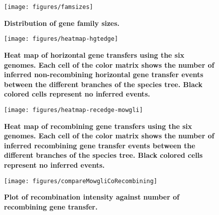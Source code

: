 \documentclass[10pt]{article}
\begin{document}
\begin{figure}[!ht]
\begin{center}
\texttt{[image: figures/famsizes]}
\end{center}
\caption{\bf{Distribution of gene family sizes.}}
\label{fig:famsizes}
\end{figure}
\clearpage{}

\begin{figure}[!ht]
\begin{center}
\texttt{[image: figures/heatmap-hgtedge]}
\end{center}
\caption{
\bf{Heat map of horizontal gene transfers using the six genomes.}
Each cell of the color matrix shows the number of inferred non-recombining
horizontal gene transfer events between the different branches of the species
tree. Black colored cells represent no inferred events.}
\label{fig:hgt-heatmap}
\end{figure}
\clearpage{}%

\begin{figure}[!ht]
\begin{center}
\texttt{[image: figures/heatmap-recedge-mowgli]}
\end{center}
\caption{
\bf{Heat map of recombining gene transfers using the six genomes.}
Each cell of the color matrix shows the number of inferred recombining
gene transfer events between the different branches of the species
tree. Black colored cells represent no inferred events.}
\label{fig:mowgli-recomb-heatmap}
\end{figure}
\clearpage{}

\begin{figure}[!ht]
\begin{center}
\texttt{[image: figures/compareMowgliCoRecombining]}
\end{center}
\caption{
\bf{Plot of recombination intensity against number
of recombining gene transfer.}}
\label{fig:cmpcomowgli}
\end{figure}
\clearpage{}
\end{document}
